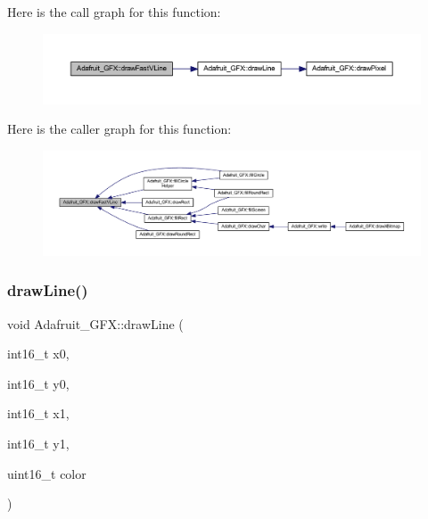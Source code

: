 Here is the call graph for this function\+:
\nopagebreak
\begin{figure}[H]
\begin{center}
\leavevmode
\includegraphics[width=350pt]{d9/d97/class_adafruit___g_f_x_a1cffbb1d69c5faf49cd0cff27686a837_cgraph}
\end{center}
\end{figure}
Here is the caller graph for this function\+:
\nopagebreak
\begin{figure}[H]
\begin{center}
\leavevmode
\includegraphics[width=350pt]{d9/d97/class_adafruit___g_f_x_a1cffbb1d69c5faf49cd0cff27686a837_icgraph}
\end{center}
\end{figure}
\mbox{\label{class_adafruit___g_f_x_aa0ff662c2b2b48c3bac51f98c777776d}} 
\subsubsection{\texorpdfstring{draw\+Line()}{drawLine()}}
{\footnotesize\ttfamily void Adafruit\+\_\+\+G\+F\+X\+::draw\+Line (\begin{DoxyParamCaption}\item[{int16\+\_\+t}]{x0,  }\item[{int16\+\_\+t}]{y0,  }\item[{int16\+\_\+t}]{x1,  }\item[{int16\+\_\+t}]{y1,  }\item[{uint16\+\_\+t}]{color }\end{DoxyParamCaption})\hspace{0.3cm}{\ttfamily [virtual]}}


